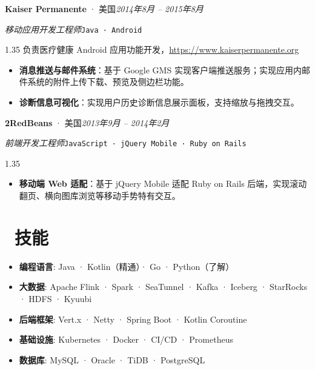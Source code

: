 \documentclass[a4paper, 11pt]{article}
\newcommand{\datedsubsection}[2]{%
  \vspace{4pt}\noindent #1\hfill\textit{#2}\par\vspace{1pt}%
}
\newcommand{\role}[2]{%
  \noindent\textit{#1}\enspace\texttt{#2}\par%
}
\newenvironment{onehalfzspacing}{\begin{spacing}{1.35}}{\end{spacing}}
\begin{document}
\datedsubsection{\textbf{Kaiser Permanente} · 美国}{2014年8月 -- 2015年8月}
\role{移动应用开发工程师}{Java · Android}
\begin{onehalfzspacing}
负责医疗健康 Android 应用功能开发，\url{https://www.kaiserpermanente.org}
\begin{itemize}
  \item \textbf{消息推送与邮件系统}：基于 Google GMS 实现客户端推送服务；实现应用内邮件系统的附件上传下载、预览及侧边栏功能。
  \item \textbf{诊断信息可视化}：实现用户历史诊断信息展示面板，支持缩放与拖拽交互。
\end{itemize}
\end{onehalfzspacing}

\datedsubsection{\textbf{2RedBeans} · 美国}{2013年9月 -- 2014年2月}
\role{前端开发工程师}{JavaScript · jQuery Mobile · Ruby on Rails}
\begin{onehalfzspacing}
\begin{itemize}
  \item \textbf{移动端 Web 适配}：基于 jQuery Mobile 适配 Ruby on Rails 后端，实现滚动翻页、横向图库浏览等移动手势特有交互。
\end{itemize}
\end{onehalfzspacing}

\section{\faCogs\ 技能}
\begin{itemize}[parsep=0.5ex]
  \item \textbf{编程语言}: Java · Kotlin（精通）· Go · Python（了解）
  \item \textbf{大数据}: Apache Flink · Spark · SeaTunnel · Kafka · Iceberg · StarRocks · HDFS · Kyuubi
  \item \textbf{后端框架}: Vert.x · Netty · Spring Boot · Kotlin Coroutine
  \item \textbf{基础设施}: Kubernetes · Docker · CI/CD · Prometheus
  \item \textbf{数据库}: MySQL · Oracle · TiDB · PostgreSQL
\end{itemize}
\end{document}
